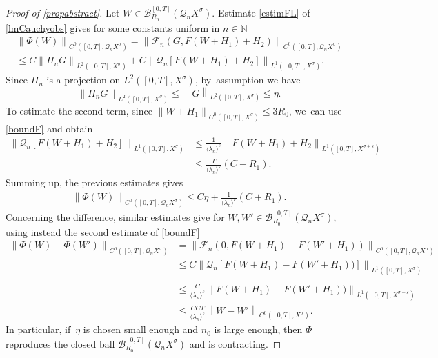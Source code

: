 \documentclass[10pt]{amsart}
\theoremstyle{definition}
\let\mc\mathcal
\let\veps\varepsilon
\newcommand{\B}{\mc{B}}
\newcommand{\N}{\mathbb{N}}
\newcommand{\Q}{\mathcal{Q}}
\providecommand{\inn}[1]{\langle#1\rangle}
\newcommand\nor[2]{\left\|#1\right\|_{#2}}
\newcommand\FL{\mathcal{F}_{n}}
\begin{document}
\begin{proof}[Proof of \cref{propabstract}]
Let $W\in \B_{R_{0}}^{[0,T]}(\Q_n X^{\sigma})$. Estimate \eqref{estimFL} of \cref{lmCauchyobs} gives for some constants uniform in $n\in \N$\vspace*{-5pt}
\begin{multline*}
\nor{\Phi(W)}{C^{0}([0,T],\Q_{n}X^{\sigma})}=\nor{\FL(G,F(W+H_{1})+H_{2})}{C^{0}([0,T],\Q_{n}X^{\sigma})}\\
\leq C \nor{\Pi_{n}G}{L^{2}([0,T],X^{\sigma})}+C\nor{\Q_{n}\left[ F(W+H_{1})+H_{2}\right]}{L^{1}([0,T],X^{\sigma})}.
\end{multline*}
Since $\Pi_{n}$ is a projection on $L^2([0,T],X^{\sigma})$, by~assumption we have\vspace*{-3pt}
\[
\nor{\Pi_{n}G}{L^{2}([0,T],X^{\sigma})}\leq \nor{G}{L^{2}([0,T],X^{\sigma})}\leq \eta.
\]
To estimate the second term, since $\nor{W+H_{1}}{C^{0}([0,T],X^{\sigma})}\leq 3R_{0}$, we~can use \eqref{boundF} and obtain\vspace*{-3pt}
\begin{equation}\label{estimFinPhi}
\begin{aligned}
\nor{\Q_{n}\left[ F(W+H_{1})\!+\!H_{2}\right]}{L^{1}([0,T],X^{\sigma})}&\leq \frac{1}{\inn{\lambda_n}^{\veps}} \nor{F(W+H_{1})\!+\!H_{2}}{L^{1}([0,T],X^{\sigma+\veps})}\\
&\leq \frac{T}{\inn{\lambda_n}^{\veps}}(C+R_{1}).
\end{aligned}
\end{equation}
Summing up, the previous estimates gives
\begin{align*}
\nor{\Phi(W)}{C^{0}([0,T],\Q_{n}X^{\sigma})}\leq C\eta+ \frac{1}{\inn{\lambda_n}^{\veps}} \left(C+R_{1}\right).
\end{align*}
Concerning the difference, similar estimates give for $W, W'\in \B_{R_{0}}^{[0,T]}(\Q_n X^{\sigma})$, using instead the second estimate of \eqref{boundF}
\begin{align}
\nonumber\nor{\Phi(W)-\Phi(W')}{C^{0}([0,T],\Q_{n}X^{\sigma})}&=\nor{\FL(0,F(W+H_{1})-F(W'+H_{1}))}{C^{0}([0,T],\Q_{n}X^{\sigma})}\\
\nonumber&\leq C\nor{\Q_{n}\left[ F(W+H_{1})-F(W'+H_{1}))\right]}{L^{1}([0,T],X^{\sigma})}\\[-7pt]
\label{bounddiffW}\\[-10pt]
\nonumber&\leq \frac{C}{\inn{\lambda_n}^{\veps}} \nor{F(W+H_{1})-F(W'+H_{1}))}{L^{1}([0,T],X^{\sigma+\veps})}\\
\nonumber&\leq \frac{CCT}{\inn{\lambda_n}^{\veps}} \nor{W-W'}{C^{0}([0,T],X^{\sigma})}.
\end{align}
In particular, if~$\eta$ is chosen small enough and $n_{0}$ is large enough, then $\Phi$ reproduces the closed ball $\B_{R_{0}}^{[0,T]}(\Q_n X^{\sigma})$ and is contracting.


\end{proof}
\end{document}
